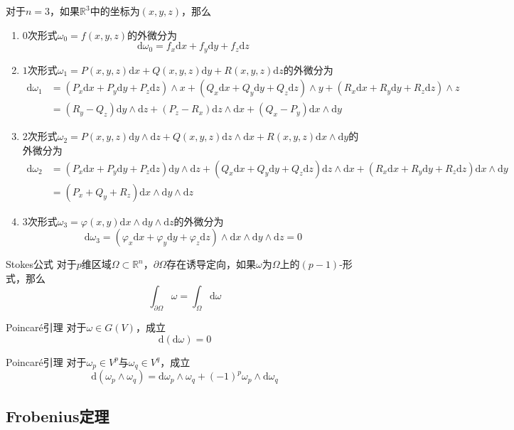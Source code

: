 \documentclass[lang = cn, scheme = chinese, thmcnt = section]{elegantbook}
\newcommand{\R}{\mathbb{R}}            %
\newcommand{\sub}{\subset}             %
\newcommand{\dd}{\mathrm{d}}           %
\begin{document}
\begin{example}
	对于$n=3$，如果$\R^3$中的坐标为$(x,y,z)$，那么
	\begin{enumerate}
		\item $0$次形式$\omega_0=f(x,y,z)$的外微分为%
		$$
		\dd\omega_0=f_x\dd x+f_y\dd y+f_z\dd z
		$$
		\item $1$次形式$\omega_1=P(x,y,z)\dd x+Q(x,y,z)\dd y+R(x,y,z)\dd z$的外微分为
		\begin{align*}
			\dd\omega_1
			& = (P_x\dd x+P_y\dd y+P_z\dd z)\wedge x
			+(Q_x\dd x+Q_y\dd y+Q_z\dd z)\wedge y
			+(R_x\dd x+R_y\dd y+R_z\dd z)\wedge z\\
			& = (R_y-Q_z)\dd y\wedge \dd z
			+(P_z-R_x)\dd z\wedge \dd x
			+(Q_x-P_y)\dd x\wedge \dd y
		\end{align*}
		\item $2$次形式$\omega_2=P(x,y,z)\dd y\wedge \dd z+Q(x,y,z)\dd z\wedge \dd x+R(x,y,z)\dd x\wedge \dd y$的外微分为
		\begin{align*}
			\dd\omega_2
			& = (P_x\dd x+P_y\dd y+P_z\dd z)\dd y\wedge \dd z
			+(Q_x\dd x+Q_y\dd y+Q_z\dd z)\dd z\wedge \dd x
			+(R_x\dd x+R_y\dd y+R_z\dd z)\dd x\wedge \dd y\\
			& = (P_x+Q_y+R_z)\dd x\wedge \dd y \wedge \dd z
		\end{align*}
		\item $3$次形式$\omega_3=\varphi(x,y)\dd x\wedge\dd y\wedge \dd z$的外微分为%
		$$
		\dd\omega_3
		=(\varphi_x\dd x+\varphi_y\dd y+\varphi_z\dd z)\wedge\dd x\wedge\dd y\wedge \dd z=0
		$$
	\end{enumerate}
\end{example}

\begin{theorem}{Stokes公式}
	对于$p$维区域$\Omega\sub\R^n$，$\partial \Omega$存在诱导定向，如果$\omega$为$\Omega$上的$(p-1)$-形式，那么%
	$$
	\int_{\partial\Omega}\omega=\int_\Omega\dd\omega
	$$
\end{theorem}

\begin{theorem}{Poincaré引理}
	对于$\omega\in G(V)$，成立%
	$$
	\dd(\dd\omega)=0
	$$
\end{theorem}

\begin{theorem}{Poincaré引理}
	对于$\omega_p\in V^p$与$\omega_q\in V^q$，成立%
	$$
	\dd(\omega_p\wedge\omega_q)
	=\dd\omega_p\wedge\omega_q+(-1)^p\omega_p\wedge\dd\omega_q
	$$
\end{theorem}

\subsection{Frobenius定理}
\end{document}
